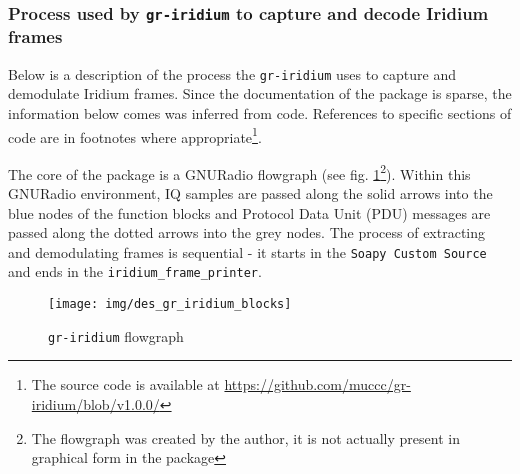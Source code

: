 
\subsubsection{Process used by \texttt{gr-iridium} to capture and decode Iridium frames}
Below is a description of the process the \texttt{gr-iridium} uses to capture and demodulate Iridium frames. Since the documentation of the package is sparse, the information below comes was inferred from code. References to specific sections of code are in footnotes where appropriate\footnote{The source code is available at \url{https://github.com/muccc/gr-iridium/blob/v1.0.0/}}.

The core of the package is a GNURadio flowgraph (see fig. \ref{f_des_gr_iridium_blocks}\footnote{The flowgraph was created by the author, it is not actually present in graphical form in the package}). Within this GNURadio environment, IQ samples are passed along the solid arrows into the blue nodes of the function blocks and Protocol Data Unit (PDU) messages are passed along the dotted arrows into the grey nodes. The process of extracting and demodulating frames is sequential - it starts in the \texttt{Soapy Custom Source} and ends in the \texttt{iridium\_frame\_printer}.

\newcommand{\grline}[2]{\footnote{gr-iridium/lib/#1\_impl.cc, line #2}}
\newcommand{\grlinetagger}[1]{\grline{iridium\_burst\_tagger}{#1}}
\newcommand{\grlinedownmix}[1]{\grline{burst\_downmix}{#1}}
\newcommand{\grlinedemod}[1]{\grline{iridium\_qpsk\_demod}{#1}}

\begin{figure}
    \centering
    \texttt{[image: img/des\_gr\_iridium\_blocks]}
    \caption{\texttt{gr-iridium} flowgraph}
    \label{f_des_gr_iridium_blocks}
\end{figure}

